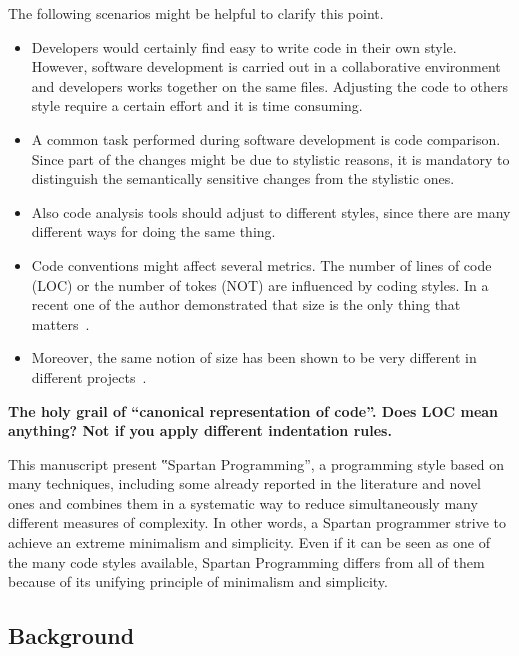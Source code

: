 The following scenarios might be helpful to clarify this point.
\begin{itemize}
    \item Developers would certainly find easy to write code in their own style. However, software
    development is carried out in a collaborative environment and developers works together on
    the same files. Adjusting the code to others style require a certain effort and it is time consuming.
    \item A common task performed during software development is code comparison.
    Since part of the changes might be due to stylistic reasons, it is mandatory to distinguish the
    semantically sensitive changes from the stylistic ones.
    \item Also code analysis tools should adjust to different styles, since there are many
        different ways for doing the same thing.
    \item Code conventions might affect several metrics. The number of lines of code (LOC) or the number of
    tokes (NOT) are influenced by coding styles. In a recent one of the author demonstrated that size
      is the only thing that matters~\cite{Gil:Lalouche:2016}.
    \item Moreover, the same notion of size has been shown to be very different in different projects~\cite{Gil:Lalouche:2016}.
\end{itemize}

\textbf{The holy grail of ``canonical representation of code''.  
  Does LOC mean anything?  Not if you apply different indentation 
rules.}

This manuscript present ‟Spartan Programming”, a programming style based on
many techniques, including some already reported in the literature and novel
ones and combines them in a systematic way to reduce simultaneously many
different measures of complexity. In other words, a Spartan programmer strive
to achieve an extreme minimalism and simplicity. Even if it can be seen as one
of the many code styles available, Spartan Programming differs from all of them
because of its unifying principle of minimalism and simplicity.

\subsection{Background}

